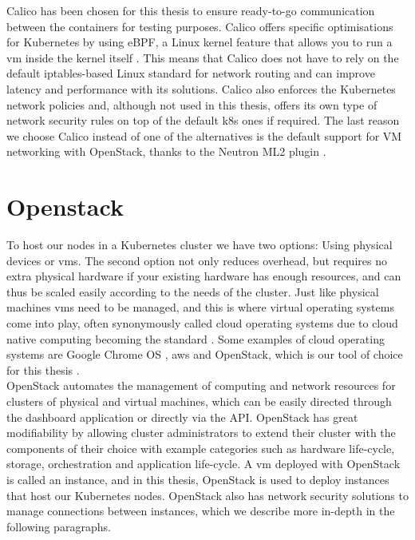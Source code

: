Calico has been chosen for this thesis to ensure ready-to-go communication between the containers for testing purposes. Calico offers specific optimisations for Kubernetes by using eBPF, a Linux kernel feature that allows you to run a \acrshort{vm} inside the kernel itself \cite{ebpf}. This means that Calico does not have to rely on the default iptables-based Linux standard for network routing and can improve latency and performance with its solutions. Calico also enforces the Kubernetes network policies and, although not used in this thesis, offers its own type of network security rules on top of the default \acrshort{k8s} ones if required. The last reason we choose Calico instead of one of the alternatives is the default support for VM networking with OpenStack, thanks to the Neutron ML2 plugin \cite{neutron}. 


\section{Openstack}\label{sec:openstack} To host our nodes in a Kubernetes cluster we have two options: Using physical devices or \acrlong{vm}s. The second option not only reduces overhead, but requires no extra physical hardware if your existing hardware has enough resources, and can thus be scaled easily according to the needs of the cluster. Just like physical machines \acrshort{vm}s need to be managed, and this is where virtual operating systems come into play, often synonymously called cloud operating systems due to cloud native computing becoming the standard \cite{CNCFSurvey}. Some examples of cloud operating systems are Google Chrome OS \cite{chromeos}, \acrshort{aws} \cite{aws} and OpenStack, which is our tool of choice for this thesis \cite{Openstack}.
\\[10pt]

OpenStack automates the management of computing and network resources for clusters of physical and virtual machines, which can be easily directed through the dashboard application or directly via the API. OpenStack has great modifiability by allowing cluster administrators to extend their cluster with the components of their choice with example categories such as hardware life-cycle, storage, orchestration and application life-cycle. A \acrshort{vm} deployed with OpenStack is called an instance, and in this thesis, OpenStack is used to deploy instances that host our Kubernetes nodes. OpenStack also has network security solutions to manage connections between instances, which we describe more in-depth in the following paragraphs.
\\[10pt]

